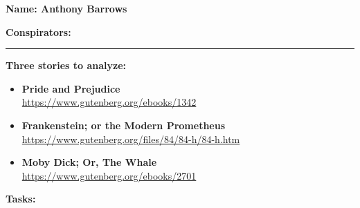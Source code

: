 \textbf{Name: Anthony Barrows} \\

\medskip

\textbf{Conspirators:} 

\medskip
\medskip

\hrule

\medskip




\assignmentsonly{\pleasesubmitprojectdraft}



\textbf{Three stories to analyze:}

\begin{itemize}
\item
  \textbf{Pride and Prejudice}\\
  \url{https://www.gutenberg.org/ebooks/1342}
\item
  \textbf{Frankenstein; or the Modern Prometheus}\\
  \url{https://www.gutenberg.org/files/84/84-h/84-h.htm}
\item
  \textbf{Moby Dick; Or, The Whale}\\
  \url{https://www.gutenberg.org/ebooks/2701}
\end{itemize}

\textbf{Tasks:}



